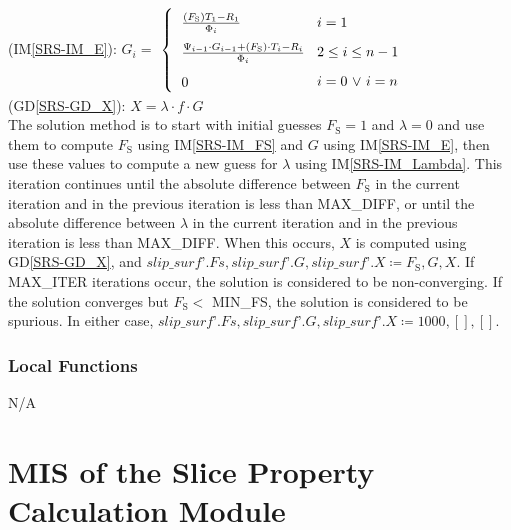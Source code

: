 \documentclass[12pt, titlepage]{article}
\newcommand{\iref}[1]{IM\ref{#1}}
\newcommand{\dref}[1]{GD\ref{#1}}
\begin{document}
\begin{itemize}
\begin{itemize}
		(\iref{SRS-IM_E}): \( G_{i}= \) 
		\(  \left\{
		\renewcommand{\arraystretch}{1.75}
		\begin{tabular}{ p{3cm} l} 
		$ \frac{ \left(F_\text{S}\right) T_{\text{1}} - R_{\text{1}} }{
			\Phi_{i} } $ &  $i=1$ \\
		\noindent\parbox[c]{\hsize} {$ \frac{ \Psi_{i-1} \cdot
				G_{i-1} + \left(F_\text{S}\right) \cdot T_{i} -
				R_{i} }{ \Phi_{i} } $} & 
		$2\leq i \leq n-1$ \\
		\noindent\parbox[c]{\hsize} {$0 $} &  $i=0$ $\lor$ $i=n$
		\end{tabular}
		\renewcommand{\arraystretch}{1}
		\right. \) \\
		
		(\dref{SRS-GD_X}): \( X = \lambda \cdot f \cdot G \) \\
		
		The solution method is to start with initial guesses $F_\text{S} = 1$ 
		and $\lambda = 0$ and use them to compute $F_\text{S}$ using 
		\iref{SRS-IM_FS} and $G$ using \iref{SRS-IM_E}, then use these values 
		to compute a new guess for $\lambda$ using \iref{SRS-IM_Lambda}. This 
		iteration continues until the absolute difference between $F_\text{S}$ 
		in the current iteration and in the previous iteration is less than 
		MAX\_DIFF, or until the absolute difference between $\lambda$ in the 
		current iteration and in the previous iteration is less than MAX\_DIFF. 
		When this occurs, $X$ is computed using \dref{SRS-GD_X}, and 
		$\textit{slip\_surf'}.Fs, \textit{slip\_surf'}.G, 
		\textit{slip\_surf'}.X \coloneqq F_\text{S}, G, X$.
		If MAX\_ITER iterations occur, the solution is considered to be 
		non-converging. If the solution converges but $F_\text{S} <$ 
		MIN\_FS, the solution is considered to be spurious. In either case, 
		$\textit{slip\_surf'}.Fs, \textit{slip\_surf'}.G, 
		\textit{slip\_surf'}.X \coloneqq 1000, [], []$.
	\end{itemize}
\end{itemize}

\subsubsection{Local Functions}
N/A


\section{MIS of the Slice Property Calculation Module} \label{sec:PropSortMod}
\end{document}
